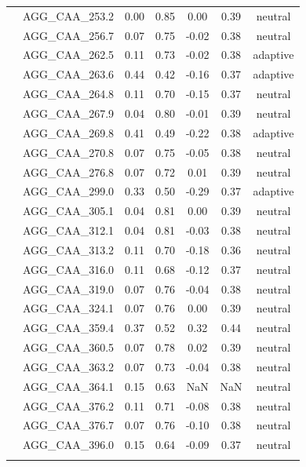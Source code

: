 \documentclass[11pt,]{article}
\begin{document}
\begin{longtable}[c]{@{}lcccccc@{}}
\\\addlinespace
& AGG\_CAA\_253.2 & 0.00 & 0.85 & 0.00 & 0.39 & neutral
\\\addlinespace
& AGG\_CAA\_256.7 & 0.07 & 0.75 & -0.02 & 0.38 & neutral
\\\addlinespace
& AGG\_CAA\_262.5 & 0.11 & 0.73 & -0.02 & 0.38 & adaptive
\\\addlinespace
& AGG\_CAA\_263.6 & 0.44 & 0.42 & -0.16 & 0.37 & adaptive
\\\addlinespace
& AGG\_CAA\_264.8 & 0.11 & 0.70 & -0.15 & 0.37 & neutral
\\\addlinespace
& AGG\_CAA\_267.9 & 0.04 & 0.80 & -0.01 & 0.39 & neutral
\\\addlinespace
& AGG\_CAA\_269.8 & 0.41 & 0.49 & -0.22 & 0.38 & adaptive
\\\addlinespace
& AGG\_CAA\_270.8 & 0.07 & 0.75 & -0.05 & 0.38 & neutral
\\\addlinespace
& AGG\_CAA\_276.8 & 0.07 & 0.72 & 0.01 & 0.39 & neutral
\\\addlinespace
& AGG\_CAA\_299.0 & 0.33 & 0.50 & -0.29 & 0.37 & adaptive
\\\addlinespace
& AGG\_CAA\_305.1 & 0.04 & 0.81 & 0.00 & 0.39 & neutral
\\\addlinespace
& AGG\_CAA\_312.1 & 0.04 & 0.81 & -0.03 & 0.38 & neutral
\\\addlinespace
& AGG\_CAA\_313.2 & 0.11 & 0.70 & -0.18 & 0.36 & neutral
\\\addlinespace
& AGG\_CAA\_316.0 & 0.11 & 0.68 & -0.12 & 0.37 & neutral
\\\addlinespace
& AGG\_CAA\_319.0 & 0.07 & 0.76 & -0.04 & 0.38 & neutral
\\\addlinespace
& AGG\_CAA\_324.1 & 0.07 & 0.76 & 0.00 & 0.39 & neutral
\\\addlinespace
& AGG\_CAA\_359.4 & 0.37 & 0.52 & 0.32 & 0.44 & neutral
\\\addlinespace
& AGG\_CAA\_360.5 & 0.07 & 0.78 & 0.02 & 0.39 & neutral
\\\addlinespace
& AGG\_CAA\_363.2 & 0.07 & 0.73 & -0.04 & 0.38 & neutral
\\\addlinespace
& AGG\_CAA\_364.1 & 0.15 & 0.63 & NaN & NaN & neutral
\\\addlinespace
& AGG\_CAA\_376.2 & 0.11 & 0.71 & -0.08 & 0.38 & neutral
\\\addlinespace
& AGG\_CAA\_376.7 & 0.07 & 0.76 & -0.10 & 0.38 & neutral
\\\addlinespace
& AGG\_CAA\_396.0 & 0.15 & 0.64 & -0.09 & 0.37 & neutral
\\\addlinespace

\end{longtable}
\end{document}
